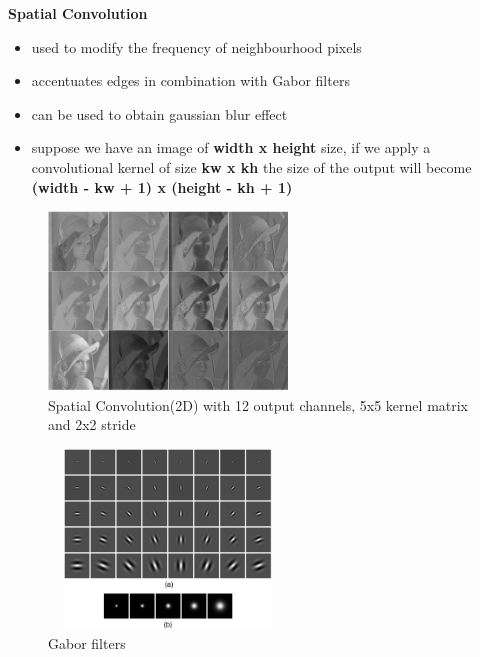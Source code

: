 \textbf{Spatial Convolution}
\begin{itemize}
	\item{used to modify the frequency of neighbourhood pixels}
	\item{accentuates edges in combination with Gabor filters}
	\item{can be used to obtain gaussian blur effect}
	\item{suppose we have an image of \textbf{width x height} size, if we apply a convolutional kernel of size \textbf{kw x kh} the size of the output will become \textbf{(width - kw + 1) x (height - kh + 1)}}
\end{itemize}


\begin{figure}[h]
	\begin{center}
		\includegraphics[width=240px,height=180px]{src/img/state/lena-spatialconv22}
		\caption{Spatial Convolution(2D) with 12 output channels, 5x5 kernel matrix and 2x2 stride} \label{fig:lena-spatialconv}
    \end{center}
\end{figure}

\begin{figure}[h]
	\begin{center}
		\includegraphics[width=240px,height=180px]{src/img/state/gabor}
		\caption{Gabor filters\cite{gabor}} \label{fig:gabor.png}
    \end{center}
\end{figure}

